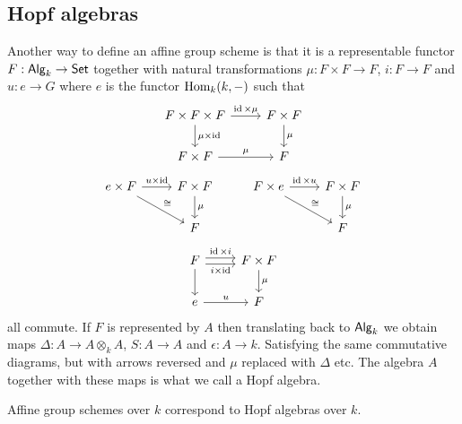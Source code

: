 \documentclass{memoir}
\begin{document}
\subsection{Hopf algebras}
Another way to define an affine group scheme is that it is a representable functor $F:{\normalfont\mathsf{Alg}}_k \to {\normalfont\mathsf{Set}}$ together with natural transformations $\mu:F\times F\to F$, $i:F\to F$ and $u:e\to G$ where $e$ is the functor $\operatorname{Hom}_k(k,-)$ such that
\begin{equation}
    \begin{tikzcd}
        F\times F\times F \arrow[r,"\id\times\mu"] \arrow[d,"\mu\times\id"] & F\times F \arrow[d,"\mu"] \\
        F\times F \arrow[r,"\mu"] & F
    \end{tikzcd}
\end{equation}
\begin{equation}
    \begin{tikzcd}
        e\times F \arrow[r,"u\times\id"] \arrow[dr,"\cong"] & F\times F \arrow[d,"\mu"] & F\times e \arrow[r,"\id\times u"] \arrow[dr,"\cong"] & F\times F \arrow[d,"\mu"] \\
                                                            & F & & F
    \end{tikzcd}
\end{equation}
\begin{equation}
    \begin{tikzcd}
        F \arrow[r,shift right,swap,"i\times\id"] \arrow[r,shift left,"\id\times i"] \arrow[d] & F\times F \arrow[d,"\mu"] \\
        e \arrow[r,"u"] & F
    \end{tikzcd}
\end{equation}
all commute.
If $F$ is represented by $A$ then translating back to ${\normalfont\mathsf{Alg}}_k$ we obtain maps $\Delta:A\to A\otimes_k A$, $S:A\to A$ and $\epsilon:A\to k$.
Satisfying the same commutative diagrams, but with arrows reversed and $\mu$ replaced with $\Delta$ etc.
The algebra $A$ together with these maps is what we call a Hopf algebra.
\begin{thm}
    Affine group schemes over $k$ correspond to Hopf algebras over $k$.
\end{thm}
\end{document}
